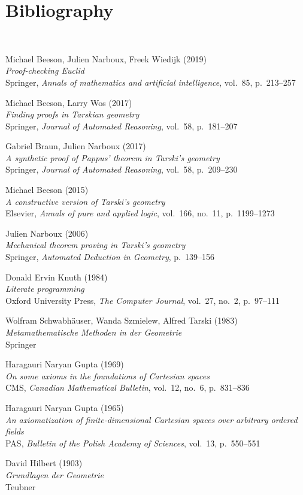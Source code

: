 \documentclass[10pt,a4paper,parskip=half,numbers=endperiod,parskip]{scrartcl}
\theoremstyle{formalized}
\begin{document}
  \newpage
  \section*{Bibliography}
  \

  Michael Beeson, Julien Narboux, Freek Wiedijk (2019)
  \\ \textit{Proof-checking Euclid}
  \\ Springer, \textit{Annals of mathematics and artificial intelligence}, vol.~85, p.~213--257

  Michael Beeson, Larry Wos (2017)
  \\ \textit{Finding proofs in Tarskian geometry}
  \\ Springer, \textit{Journal of Automated Reasoning}, vol.~58, p.~181--207

  Gabriel Braun, Julien Narboux (2017)
  \\ \textit{A synthetic proof of Pappus' theorem in Tarski's geometry}
  \\ Springer, \textit{Journal of Automated Reasoning}, vol.~58, p.~209--230

  Michael Beeson (2015)
  \\ \textit{A constructive version of Tarski's geometry}
  \\ Elsevier, \textit{Annals of pure and applied logic}, vol.~166, no.~11, p.~1199--1273

  Julien Narboux (2006)
  \\ \textit{Mechanical theorem proving in Tarski's geometry}
  \\ Springer, \textit{Automated Deduction in Geometry}, p.~139--156

  Donald Ervin Knuth (1984)
  \\ \textit{Literate programming}
  \\ Oxford University Press, \textit{The Computer Journal}, vol.~27, no.~2, p.~97--111

  Wolfram Schwabhäuser, Wanda Szmielew, Alfred Tarski (1983)
  \\ \textit{Metamathematische Methoden in der Geometrie}
  \\ Springer

  Haragauri Naryan Gupta (1969)
  \\ \textit{On some axioms in the foundations of Cartesian spaces}
  \\ CMS,
  \textit{Canadian Mathematical Bulletin}, vol.~12, no.~6, p.~831--836

  Haragauri Naryan Gupta (1965)
  \\ \textit{An axiomatization of finite-dimensional Cartesian spaces over arbitrary ordered fields}
  \\ PAS,
  \textit{Bulletin of the Polish Academy of Sciences}, vol.~13, p.~550--551

  David Hilbert (1903)
  \\ \textit{Grundlagen der Geometrie}
  \\ Teubner
\end{document}
